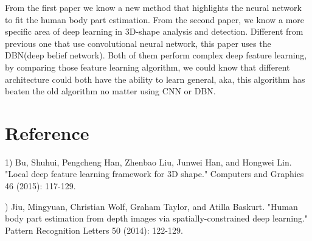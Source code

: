 \documentclass[pdftex,12pt,a4paper]{article}
\begin{document}
From the first paper we know a new method that highlights the neural network to fit the human body part estimation. From the second paper, we know a more specific area of deep learning in 3D-shape analysis and detection. Different from previous one that use convolutional neural network, this paper uses the DBN(deep belief network). Both of them perform complex deep feature learning, by comparing those feature learning algorithm, we could know that different architecture could both have the ability to learn general, aka, this algorithm has beaten the old algorithm no matter using CNN or DBN. 


\section{Reference}
1) Bu, Shuhui, Pengcheng Han, Zhenbao Liu, Junwei Han, and Hongwei Lin. "Local deep feature learning framework for 3D shape." Computers  and Graphics 46 (2015): 117-129.

) Jiu, Mingyuan, Christian Wolf, Graham Taylor, and Atilla Baskurt. "Human body part estimation from depth images via spatially-constrained deep learning." Pattern Recognition Letters 50 (2014): 122-129.
\end{document}
